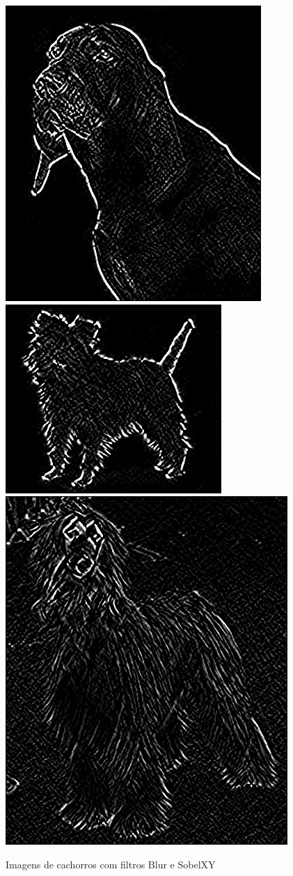 \documentclass{article}
\begin{document}
\begin{figure}[h]
    \centering
    \includegraphics[scale=0.3]{ex_cachorro}
    \includegraphics[scale=0.3]{ex_cachorro2}
    \includegraphics[scale=0.3]{ex_cachorro3}
    \caption{Imagens de cachorros com filtros Blur e SobelXY}
\end{figure}
\end{document}
